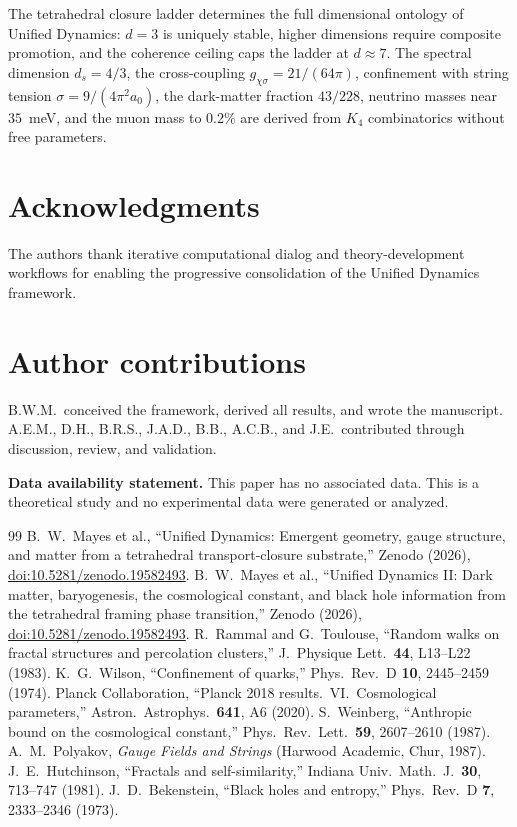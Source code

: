 \documentclass[11pt,twocolumn]{article}
\begin{document}
The tetrahedral closure ladder determines the full dimensional ontology of Unified Dynamics: $d=3$ is uniquely stable, higher dimensions require composite promotion, and the coherence ceiling caps the ladder at $d\approx 7$.
The spectral dimension $d_s=4/3$, the cross-coupling $g_{\chi\sigma}=21/(64\pi)$, confinement with string tension $\sigma=9/(4\pi^2 a_0)$, the dark-matter fraction $43/228$, neutrino masses near $35$~meV, and the muon mass to $0.2\%$ are derived from $K_4$ combinatorics without free parameters.

\section*{Acknowledgments}
The authors thank iterative computational dialog and theory-development workflows for enabling the progressive consolidation of the Unified Dynamics framework.

\section*{Author contributions}
B.W.M.\ conceived the framework, derived all results, and wrote the manuscript.
A.E.M., D.H., B.R.S., J.A.D., B.B., A.C.B., and J.E.\ contributed through discussion, review, and validation.

\smallskip
\noindent\textbf{Data availability statement.}
This paper has no associated data.
This is a theoretical study and no experimental data were generated or analyzed.

\begin{thebibliography}{99}
 B.~W.~Mayes et al., ``Unified Dynamics: Emergent geometry, gauge structure, and matter from a tetrahedral transport-closure substrate,'' Zenodo (2026), \href{https://doi.org/10.5281/zenodo.19582493}{doi:10.5281/zenodo.19582493}.
 B.~W.~Mayes et al., ``Unified Dynamics II: Dark matter, baryogenesis, the cosmological constant, and black hole information from the tetrahedral framing phase transition,'' Zenodo (2026), \href{https://doi.org/10.5281/zenodo.19582493}{doi:10.5281/zenodo.19582493}.
 R.~Rammal and G.~Toulouse, ``Random walks on fractal structures and percolation clusters,'' J.\ Physique Lett.\ \textbf{44}, L13--L22 (1983).
 K.~G.~Wilson, ``Confinement of quarks,'' Phys.\ Rev.\ D \textbf{10}, 2445--2459 (1974).
 Planck Collaboration, ``Planck 2018 results.\ VI.\ Cosmological parameters,'' Astron.\ Astrophys.\ \textbf{641}, A6 (2020).
 S.~Weinberg, ``Anthropic bound on the cosmological constant,'' Phys.\ Rev.\ Lett.\ \textbf{59}, 2607--2610 (1987).
 A.~M.~Polyakov, \textit{Gauge Fields and Strings} (Harwood Academic, Chur, 1987).
 J.~E.~Hutchinson, ``Fractals and self-similarity,'' Indiana Univ.\ Math.\ J.\ \textbf{30}, 713--747 (1981).
 J.~D.~Bekenstein, ``Black holes and entropy,'' Phys.\ Rev.\ D \textbf{7}, 2333--2346 (1973).
\end{thebibliography}
\end{document}
